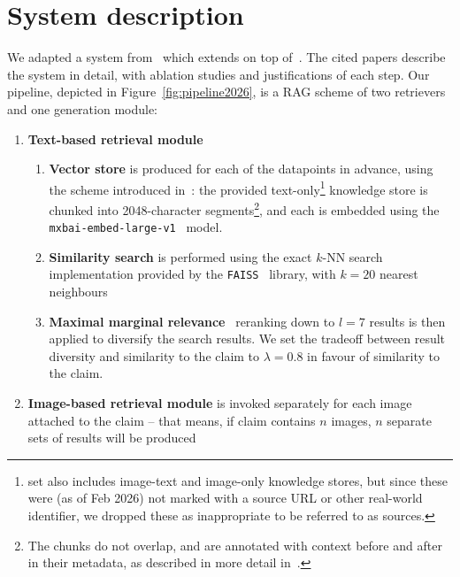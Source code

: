 
\section{System description}
\label{sec:system2026}

We adapted a system from~\citealt{ullrich-drchal-2025-aic} which extends on top of~\citealt{ullrich-etal-2024-aic}.
The cited papers describe the system in detail, with ablation studies and justifications of each step.
Our pipeline, depicted in Figure~\ref{fig:pipeline2026}, is a RAG scheme of two retrievers and one generation module:

\begin{enumerate}[label=\roman*.]  %
\item \textbf{Text-based retrieval module}
\begin{enumerate}[label=\arabic*.]  %
    \item \textbf{Vector store} is produced for each of the \averitec{} datapoints in advance, using the scheme introduced in~\citealt{ullrich-etal-2024-aic}: the provided text-only\footnote{\averitec{} set also includes image-text and image-only knowledge stores, but since these were (as of Feb 2026) not marked with a source URL or other real-world identifier, we dropped these as inappropriate to be referred to as sources.}  \averitec{} knowledge store is chunked into 2048-character segments\footnote{The chunks do not overlap, and are annotated with context before and after in their metadata, as described in more detail in~\citealt{ullrich-etal-2024-aic}.}, and each is embedded using the \texttt{mxbai-embed-large-v1}~\cite{li-li-2024-aoe,emb2024mxbai} model.
    \item \textbf{Similarity search} is performed using the exact $k$-NN search implementation provided by the \texttt{FAISS}~\cite{douze2024faiss,johnson2019billion} library, with $k=20$ nearest neighbours
    \item \textbf{Maximal marginal relevance}~\cite{carbonell-mmr} reranking down to $l=7$ results is then applied to diversify the search results. We set the tradeoff between result diversity and similarity to the claim to $\lambda=0.8$ in favour of similarity to the claim.
\end{enumerate}
\item \textbf{Image-based retrieval module} is invoked separately for each image attached to the \averitec{} claim -- that means, if claim contains $n$ images, $n$ separate sets of results will be produced

\end{enumerate}
